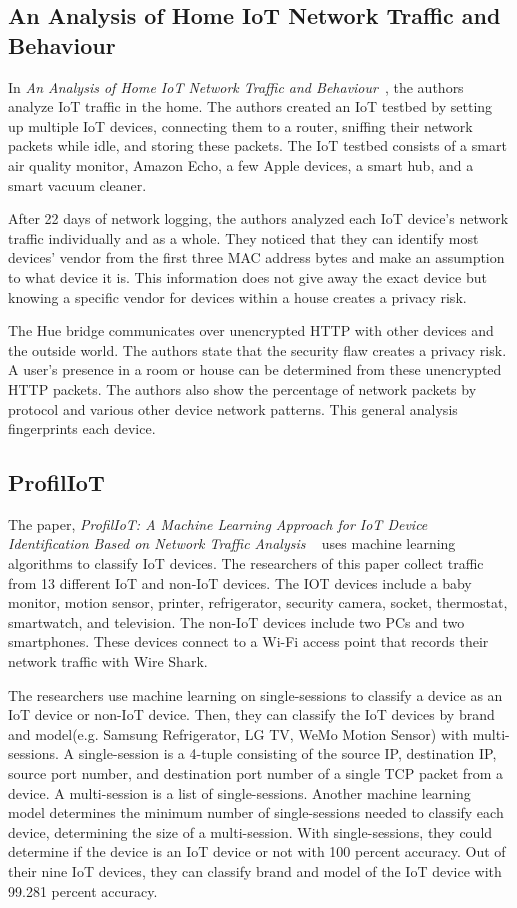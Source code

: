\subsection{An Analysis of Home IoT Network Traffic and Behaviour}
\label{homeIoTPaper}
In \textit{An Analysis of Home IoT Network Traffic and Behaviour}~\cite{home_iot}, the authors analyze IoT traffic in the home. The authors created an IoT testbed by setting up multiple IoT devices, connecting them to a router, sniffing their network packets while idle, and storing these packets. The IoT testbed consists of a smart air quality monitor, Amazon Echo, a few Apple devices, a smart hub, and a smart vacuum cleaner.

After 22 days of network logging, the authors analyzed each IoT device's network traffic individually and as a whole. They noticed that they can identify most devices' vendor from the first three MAC address bytes and make an assumption to what device it is. This information does not give away the exact device but knowing a specific vendor for devices within a house creates a privacy risk.

The Hue bridge communicates over unencrypted HTTP with other devices and the outside world. The authors state that the security flaw creates a privacy risk. A user’s presence in a room or house can be determined from these unencrypted HTTP packets. The authors also show the percentage of network packets by protocol and various other device network patterns. This general analysis fingerprints each device.

\subsection{ProfilIoT}
\label{ProfilIoTPaper}
The paper, \textit{ProfilIoT: A Machine Learning Approach for IoT Device Identification Based on Network Traffic Analysis} ~\cite{Meidan:2017:PML:3019612.3019878} uses machine learning algorithms to classify IoT devices. The researchers of this paper collect traffic from 13 different IoT and non-IoT devices. The IOT devices include a baby monitor, motion sensor, printer, refrigerator, security camera, socket, thermostat, smartwatch, and television. The non-IoT devices include two PCs and two smartphones. These devices connect to a Wi-Fi access point that records their network traffic with Wire Shark\cite{wireshark}.

The researchers use machine learning on single-sessions to classify a device as an IoT device or non-IoT device. Then, they can classify the IoT devices by brand and model(e.g. Samsung Refrigerator, LG TV, WeMo Motion Sensor) with multi-sessions. A single-session is a 4-tuple consisting of the source IP, destination IP, source port number, and destination port number of a single TCP packet from a device. A multi-session is a list of single-sessions. Another machine learning model determines the minimum number of single-sessions needed to classify each device, determining the size of a multi-session. With single-sessions, they could determine if the device is an IoT device or not with 100 percent accuracy. Out of their nine IoT devices, they can classify brand and model of the IoT device with 99.281 percent accuracy.

